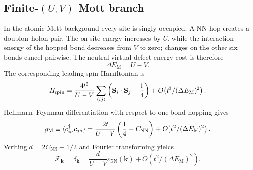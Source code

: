\documentclass[10pt]{article}
\newcommand{\epsk}{\varepsilon_{\mathrm{NN}}(\mathbf{k})}
\newcommand{\Cnn}{C_{\mathrm{NN}}}
\newcommand{\dk}{\delta_{\mathbf{k}}}
\begin{document}
\subsection{Finite-$(U,V)$ Mott branch}
\label{sec:s-finite-uv-mott}
In the atomic Mott background every site is singly occupied. A NN hop creates
a doublon--holon pair. The on-site energy increases by $U$, while the
interaction energy of the hopped bond decreases from $V$ to zero; changes on
the other six bonds cancel pairwise. The neutral virtual-defect energy cost is
therefore
\begin{equation}
 \Delta E_{\mathrm M}=U-V .
 \label{eq:s-mott-denominator-uv}
\end{equation}
The corresponding leading spin Hamiltonian is
\begin{equation}
 H_{\rm spin}
 =\frac{4t^2}{U-V}\sum_{\langle ij\rangle}
 \left(\mathbf S_i\cdot\mathbf S_j-\frac14\right)
 +O\!\left(t^3/(\Delta E_{\mathrm M})^2\right).
 \label{eq:s-spin-hamiltonian-uv}
\end{equation}
Hellmann--Feynman differentiation with respect to one bond hopping gives
\begin{equation}
 g_{\rm M}\equiv
 \langle c^\dagger_{i\sigma}c_{j\sigma}\rangle
 =\frac{2t}{U-V}\left(\frac14-\Cnn\right)
 +O\!\left(t^2/(\Delta E_{\mathrm M})^2\right).
 \label{eq:s-mott-coherence-uv}
\end{equation}
Writing $d=2\Cnn-1/2$ and Fourier transforming yields
\begin{equation}
 \mathcal F_{\mathbf k}=\dk
 =\frac{d}{U-V}\epsk+O\!\left(t^2/(\Delta E_{\mathrm M})^2\right).
 \label{eq:s-mott-delta-uv}
\end{equation}
\end{document}
